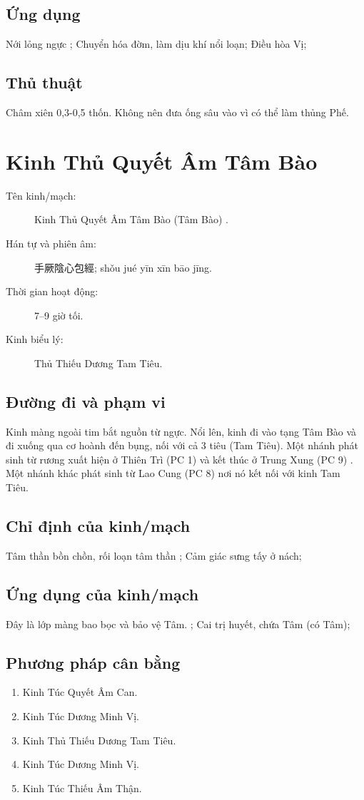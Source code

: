 \documentclass[12pt,a4paper]{article}
\begin{document}
\subsection*{Ứng dụng}Nới lỏng ngực ; Chuyển hóa đờm, làm dịu khí nổi loạn; Điều hòa Vị;
\subsection*{Thủ thuật}Châm xiên 0,3-0,5 thốn. Không nên đưa ống sâu vào vì có thể làm thủng Phế.

\clearpage
\section{Kinh Thủ Quyết Âm Tâm Bào}
\begin{description}
\item[Tên kinh/mạch:] Kinh Thủ Quyết Âm Tâm Bào (Tâm Bào) .
\item[Hán tự và phiên âm:] 手厥陰心包經; shǒu jué yīn xīn bāo jīng.
\item[Thời gian hoạt động:] 7--9 giờ tối.
\item[Kinh biểu lý:] Thủ Thiếu Dương Tam Tiêu.
\end{description}
\subsection*{Đường đi và phạm vi}Kinh màng ngoài tim bắt nguồn từ ngực. Nổi lên, kinh đi vào tạng Tâm Bào và đi xuống qua cơ hoành đến bụng, nối với cả 3 tiêu (Tam Tiêu). Một nhánh phát sinh từ rương xuất hiện ở Thiên Trì (PC 1) và kết thúc ở Trung Xung (PC 9) . Một nhánh khác phát sinh từ Lao Cung (PC 8) nơi nó kết nối với kinh Tam Tiêu.
\subsection*{Chỉ định của kinh/mạch}Tâm thần bồn chồn, rối loạn tâm thần ; Cảm giác sưng tấy ở nách;
\subsection*{Ứng dụng của kinh/mạch}Đây là lớp màng bao bọc và bảo vệ Tâm. ; Cai trị huyết, chứa Tâm (có Tâm);
\subsection*{Phương pháp cân bằng}
\begin{enumerate}
\item Kinh Túc Quyết Âm Can.
\item Kinh Túc Dương Minh Vị.
\item Kinh Thủ Thiếu Dương Tam Tiêu.
\item Kinh Túc Dương Minh Vị.
\item Kinh Túc Thiếu Âm Thận.
\end{enumerate}
\end{document}
